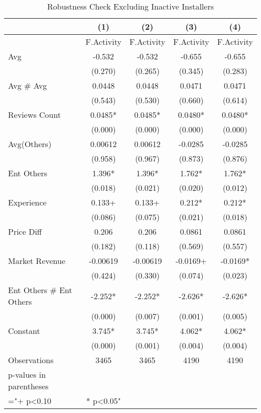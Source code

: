 \begin{table}
\centering
\begin{tabular}{@{}lcccc@{}}
\toprule
 & (1) & (2) & (3) & (4) \\ \midrule
 & F.Activity & F.Activity & F.Activity & F.Activity \\
Avg & -0.532 & -0.532 & -0.655 & -0.655 \\
 & (0.270) & (0.265) & (0.345) & (0.283) \\
Avg \# Avg & 0.0448 & 0.0448 & 0.0471 & 0.0471 \\
 & (0.543) & (0.530) & (0.660) & (0.614) \\
Reviews Count & 0.0485* & 0.0485* & 0.0480* & 0.0480* \\
 & (0.000) & (0.000) & (0.000) & (0.000) \\
Avg(Others) & 0.00612 & 0.00612 & -0.0285 & -0.0285 \\
 & (0.958) & (0.967) & (0.873) & (0.876) \\
Ent Others & 1.396* & 1.396* & 1.762* & 1.762* \\
 & (0.018) & (0.021) & (0.020) & (0.012) \\
Experience & 0.133+ & 0.133+ & 0.212* & 0.212* \\
 & (0.086) & (0.075) & (0.021) & (0.018) \\
Price Diff & 0.206 & 0.206 & 0.0861 & 0.0861 \\
 & (0.182) & (0.118) & (0.569) & (0.557) \\
Market Revenue & -0.00619 & -0.00619 & -0.0169+ & -0.0169* \\
 & (0.424) & (0.330) & (0.074) & (0.023) \\
Ent Others \# Ent Others & -2.252* & -2.252* & -2.626* & -2.626* \\
 & (0.000) & (0.007) & (0.001) & (0.005) \\
Constant & 3.745* & 3.745* & 4.062* & 4.062* \\
 & (0.000) & (0.001) & (0.004) & (0.004) \\
Observations & 3465 & 3465 & 4190 & 4190 \\
p-values in parentheses &  &  &  &  \\
="+ p\textless{}0.10 & * p\textless{}0.05" &  &  &  \\ \bottomrule
\end{tabular}
\caption{Robustness Check Excluding Inactive Installers}
\label{rob_exclude_inactive}
\end{table}
